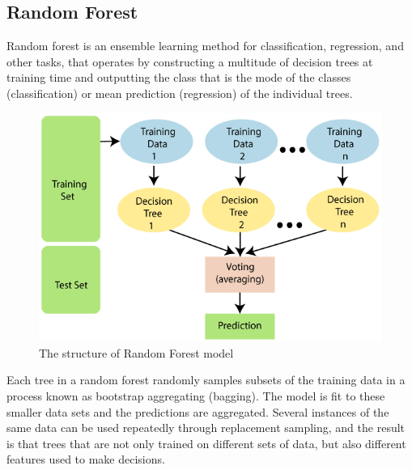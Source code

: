 \documentclass{ieeeojies}
\begin{document}
\subsection{Random Forest}
Random forest is an ensemble learning method for classification, regression, and other tasks, that operates by constructing a multitude of decision trees at training time and outputting the class that is the mode of the classes (classification) or mean prediction (regression) of the individual trees.
\begin{figure}[H]
	\centering
	\begin{minipage}{0.23\textwidth}
		\centering
		\includegraphics[width=1\textwidth]{bibliography/Images/RandomForest_Img1.png}
		\caption{The structure of Random Forest model}
		\label{fig:1}
	\end{minipage}
\end{figure}
Each tree in a random forest randomly samples subsets of the training data in a process known as bootstrap aggregating (bagging). The model is fit to these smaller data sets and the predictions are aggregated. Several instances of the same data can be used repeatedly through replacement sampling, and the result is that trees that are not only trained on different sets of data, but also different features used to make decisions.
\end{document}
